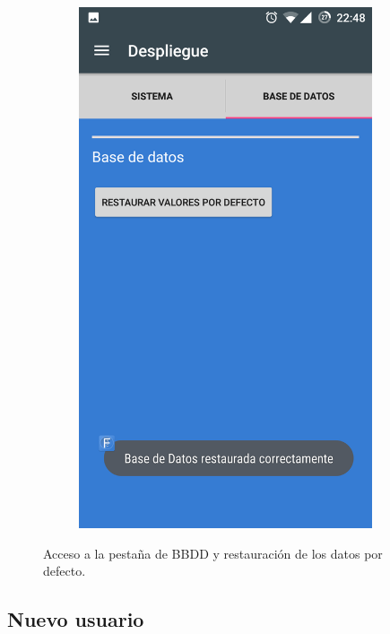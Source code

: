 \documentclass[../PFC.tex]{subfiles}
\begin{document}
\begin{figure}[H]
\begin{subfigure}{0.32\textwidth}
       \includegraphics[width=0.95\textwidth]{./img/app/despliegueBaseDeDatosMensaje}
    \end{subfigure}   
  \caption{Acceso a la pestaña de BBDD y restauración de los datos por defecto.}
  \label{img:app:baseDatos}
\end{figure}

\subsection{Nuevo usuario}
\label{App:AD:Nuevo usuario}
\end{document}

